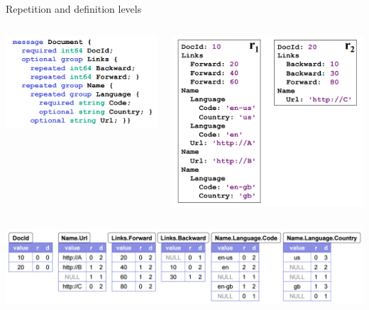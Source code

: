 \documentclass{beamer}
\begin{document}
\begin{frame}{Repetition and definition levels}
\vspace{0.5 cm}
\begin{columns}[T]
\includegraphics[width=\linewidth]{repetition_and_definition_schema.png}

\includegraphics[width=\linewidth]{repetition_and_definition_data.png}
\end{columns}

\vspace{0.5 cm}
\includegraphics[width=\linewidth]{repetition_and_definition_arrays.png}
\end{frame}
\end{document}
